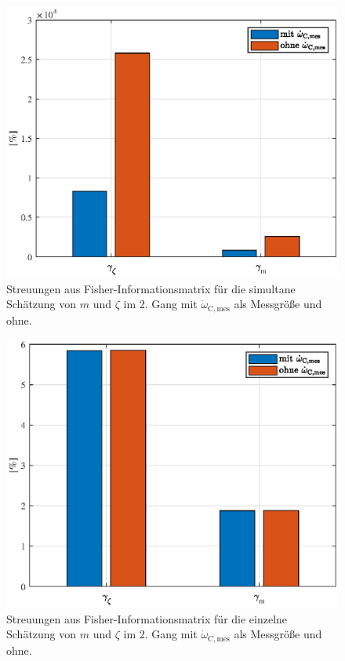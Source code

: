 \begin{figure}[ht]
  \centering
 \includegraphics[scale=0.9]{figures/03_Sensitivitaetsanalyse/03_Fisher_Info/Gang2/m_vs_zeta.eps}
  \caption{Streuungen aus Fisher-Informationsmatrix für die simultane Schätzung von $m$ und $\zeta$ im 2. Gang mit $\dot{\omega}_\mathrm{C,mes}$ als Messgröße und ohne.} \label{fig:Gang2_m_z_sim}
\end{figure} 

\begin{figure}[ht]
  \centering
 \includegraphics[scale=0.9]{figures/03_Sensitivitaetsanalyse/03_Fisher_Info/Gang2/m_vs_zeta_einzeln.eps}
  \caption{Streuungen aus Fisher-Informationsmatrix für die einzelne Schätzung von $m$ und $\zeta$ im 2. Gang mit $\dot{\omega}_\mathrm{C,mes}$ als Messgröße und ohne.}\label{fig:Gang2_m_z_sep}
\end{figure} 


